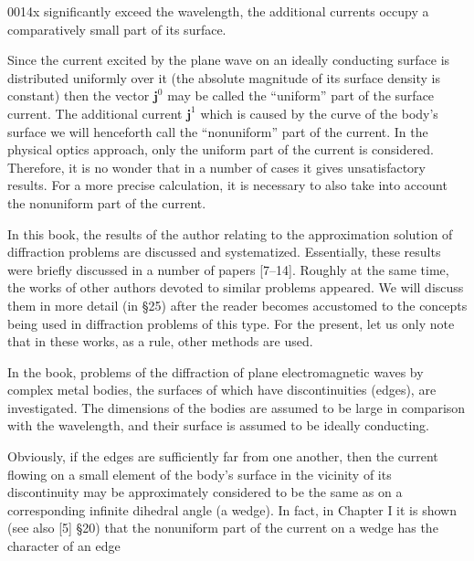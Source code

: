\begin{scanpage}{0014}{x}
significantly exceed the wavelength, the additional currents occupy a comparatively small part of its surface.

Since the current excited by the plane wave on an ideally conducting surface is distributed uniformly over it (the absolute magnitude of its surface density is constant) then the vector $\mathbf j^0$ may be called the ``uniform'' part of the surface current. The additional current $\mathbf j^1$ which is caused by the curve of the body's surface we will henceforth call the ``nonuniform'' part of the current. In the physical optics approach, only the uniform part of the current is considered. Therefore, it is no wonder that in a number of cases it gives unsatisfactory results. For a more precise calculation, it is necessary to also take into account the nonuniform part of the current.

In this book, the results of the author relating to the approximation solution of diffraction problems are discussed and systematized. Essentially, these results were briefly discussed in a number of papers [7--14]. Roughly at the same time, the works of other authors devoted to similar problems appeared. We will discuss them in more detail (in \S 25) after the reader becomes accustomed to the concepts being used in diffraction problems of this type. For the present, let us only note that in these works, as a rule, other methods are used.

In the book, problems of the diffraction of plane electromagnetic waves by complex metal bodies, the surfaces of which have discontinuities (edges), are investigated. The dimensions of the bodies are assumed to be large in comparison with the wavelength, and their surface is assumed to be ideally conducting.

Obviously, if the edges are sufficiently far from one another, then the current flowing on a small element of the body's surface in the vicinity of its discontinuity may be approximately considered to be the same as on a corresponding infinite dihedral angle (a wedge). In fact, in Chapter I it is shown (see also [5] \S 20) that the nonuniform part of the current on a wedge has the character of an edge
\end{scanpage}
